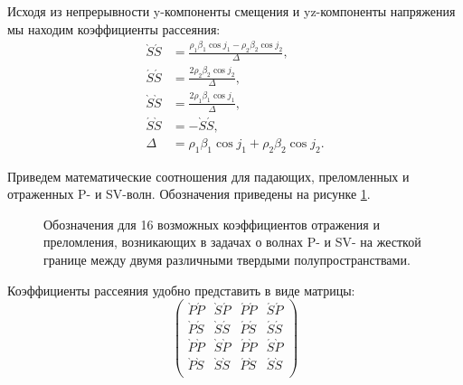 Исходя из непрерывности y-компоненты смещения и yz-компоненты напряжения мы находим коэффициенты рассеяния:
\begin{align}
\grave{S}\acute{S} &= \frac{\rho_1 \beta_1 \cos{j_1} - \rho_2 \beta_2 \cos{j_2}}{\Delta}, \nonumber\\
\acute{S}\acute{S} &= \frac{2 \rho_2 \beta_2 \cos{j_2}}{\Delta}, \nonumber\\
\grave{S}\grave{S} &= \frac{2 \rho_1 \beta_1 \cos{j_1}}{\Delta}, \nonumber\\
\acute{S}\grave{S} &= - \grave{S}\acute{S}, \nonumber\\
\Delta &= \rho_1 \beta_1 \cos{j_1} + \rho_2 \beta_2 \cos{j_2}.
\end{align}

Приведем математические соотношения для падающих, преломленных и отраженных P- и SV-волн. Обозначения приведены на рисунке \ref{fig32}.

\begin{figure}[h]
\caption{Обозначения для 16 возможных коэффициентов отражения и преломления, возникающих в задачах о волнах P- и SV- на жесткой границе между двумя различными твердыми полупространствами.}
\label{fig32}
\end{figure}

Коэффициенты рассеяния удобно представить в виде матрицы:
\begin{displaymath}
\left( \begin{array}{cccc}
\grave{P}\acute{P} & \grave{S}\acute{P} & \acute{P}\acute{P} & \acute{S}\acute{P} \\
\grave{P}\acute{S} & \grave{S}\acute{S} & \acute{P}\acute{S} & \acute{S}\acute{S} \\
\grave{P}\grave{P} & \grave{S}\grave{P} & \acute{P}\grave{P} & \acute{S}\grave{P} \\
\grave{P}\grave{S} & \grave{S}\grave{S} & \acute{P}\grave{S} & \acute{S}\grave{S} \\
\end{array} \right)
\end{displaymath} 


